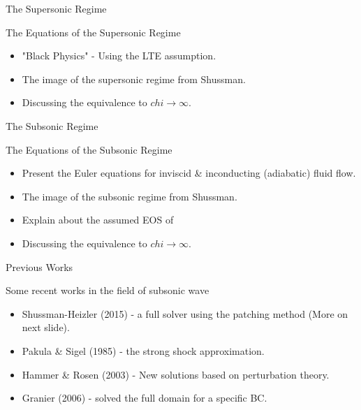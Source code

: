 \documentclass[presentation,10pt]{beamer}
\begin{document}
\begin{frame}{The Supersonic Regime}
  \begin{block}{The Equations of the Supersonic Regime}
    \begin{itemize}
      \item "Black Physics" - Using the LTE assumption.
      \item The image of the supersonic regime from Shussman.
      \item Discussing the equivalence to $chi \to \infty$.
    \end{itemize}
  \end{block}
\end{frame}


\begin{frame}{The Subsonic Regime}
  \begin{block}{The Equations of the Subsonic Regime}
    \begin{itemize}
      \item Present the Euler equations for inviscid \& inconducting (adiabatic) fluid flow.
      \item The image of the subsonic regime from Shussman.
      \item Explain about the assumed EOS of
      \item Discussing the equivalence to $chi \to \infty$.
    \end{itemize}
  \end{block}
\end{frame}

\begin{frame}{Previous Works}
  \begin{block}{Some recent works in the field of subsonic wave}
    \begin{itemize}
      \item Shussman-Heizler (2015) - a full solver using the patching method (More on next slide).
      \item Pakula \& Sigel (1985) - the strong shock approximation.
      \item Hammer \& Rosen (2003) - New solutions based on perturbation theory.
      \item Granier (2006) - solved the full domain for a specific BC.
    \end{itemize}
  \end{block}
\end{frame}
\end{document}
